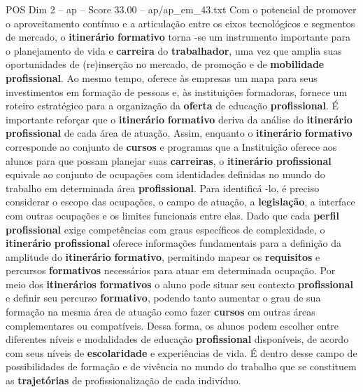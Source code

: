 \begin{textsample}{POS Dim 2 – ap – Score 33.00 – ap/ap\_em\_43.txt}
Com o potencial de promover o aproveitamento contínuo e a articulação entre os eixos tecnológicos e segmentos de mercado, o \textbf{itinerário} \textbf{formativo} torna -se um instrumento importante para o planejamento de vida e \textbf{carreira} do \textbf{trabalhador}, uma vez que amplia suas oportunidades de (re)inserção no mercado, de promoção e de \textbf{mobilidade} \textbf{profissional}.
Ao mesmo tempo, oferece às empresas um mapa para seus investimentos em formação de pessoas e, às instituições formadoras, fornece um roteiro estratégico para a organização da \textbf{oferta} de educação \textbf{profissional}.
É importante reforçar que o \textbf{itinerário} \textbf{formativo} deriva da análise do \textbf{itinerário} \textbf{profissional} de cada área de atuação.
Assim, enquanto o \textbf{itinerário} \textbf{formativo} corresponde ao conjunto de \textbf{cursos} e programas que a Instituição oferece aos alunos para que possam planejar suas \textbf{carreiras}, o \textbf{itinerário} \textbf{profissional} equivale ao conjunto de ocupações com identidades definidas no mundo do trabalho em determinada área \textbf{profissional}.
Para identificá -lo, é preciso considerar o escopo das ocupações, o campo de atuação, a \textbf{legislação}, a interface com outras ocupações e os limites funcionais entre elas.
Dado que cada \textbf{perfil} \textbf{profissional} exige competências com graus específicos de complexidade, o \textbf{itinerário} \textbf{profissional} oferece informações fundamentais para a definição da amplitude do \textbf{itinerário} \textbf{formativo}, permitindo mapear os \textbf{requisitos} e percursos \textbf{formativos} necessários para atuar em determinada ocupação.
Por meio dos \textbf{itinerários} \textbf{formativos} o aluno pode situar seu contexto \textbf{profissional} e definir seu percurso \textbf{formativo}, podendo tanto aumentar o grau de sua formação na mesma área de atuação como fazer \textbf{cursos} em outras áreas complementares ou compatíveis.
Dessa forma, os alunos podem escolher entre diferentes níveis e modalidades de educação \textbf{profissional} disponíveis, de acordo com seus níveis de \textbf{escolaridade} e experiências de vida.
É dentro desse campo de possibilidades de formação e de vivência no mundo do trabalho que se constituem as \textbf{trajetórias} de profissionalização de cada indivíduo.

\end{textsample}
